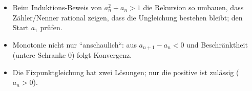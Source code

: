 \begin{achtung}
\begin{itemize}
  \item Beim Induktions-Beweis von $a_n^2+a_n>1$ die Rekursion so
        umbauen, dass Z\"ahler/Nenner rational zeigen, dass die
        Ungleichung bestehen bleibt; den Start $a_1$ pr\"ufen.
  \item Monotonie nicht nur ``anschaulich``: aus $a_{n+1}-a_n<0$ und
        Beschr\"anktheit (untere Schranke $0$) folgt Konvergenz.
  \item Die Fixpunktgleichung hat zwei L\"osungen; nur die positive ist
        zul\"assig ($a_n>0$).
\end{itemize}
\end{achtung}
